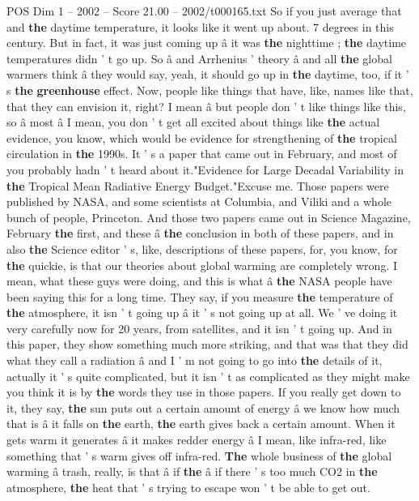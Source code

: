 \begin{textsample}{POS Dim 1 – 2002 – Score 21.00 – 2002/t000165.txt}
So if you just average that and \textbf{the} daytime temperature, it looks like it went up about. 7 degrees in this century.
But in fact, it was just coming up â it was \textbf{the} nighttime ; \textbf{the} daytime temperatures didn ' t go up.
So â and Arrhenius ' theory â and all \textbf{the} global warmers think â they would say, yeah, it should go up in \textbf{the} daytime, too, if it ' s \textbf{the} \textbf{greenhouse} effect.
Now, people like things that have, like, names like that, that they can envision it, right?
I mean â but people don ' t like things like this, so â most â I mean, you don ' t get all excited about things like \textbf{the} actual evidence, you know, which would be evidence for strengthening of \textbf{the} tropical circulation in \textbf{the} 1990s.
It ' s a paper that came out in February, and most of you probably hadn ' t heard about it."Evidence for Large Decadal Variability in \textbf{the} Tropical Mean Radiative Energy Budget."Excuse me.
Those papers were published by NASA, and some scientists at Columbia, and Viliki and a whole bunch of people, Princeton.
And those two papers came out in Science Magazine, February \textbf{the} first, and these â \textbf{the} conclusion in both of these papers, and in also \textbf{the} Science editor ' s, like, descriptions of these papers, for, you know, for \textbf{the} quickie, is that our theories about global warming are completely wrong.
I mean, what these guys were doing, and this is what â \textbf{the} NASA people have been saying this for a long time.
They say, if you measure \textbf{the} temperature of \textbf{the} atmosphere, it isn ' t going up â it ' s not going up at all.
We ' ve doing it very carefully now for 20 years, from satellites, and it isn ' t going up.
And in this paper, they show something much more striking, and that was that they did what they call a radiation â and I ' m not going to go into \textbf{the} details of it, actually it ' s quite complicated, but it isn ' t as complicated as they might make you think it is by \textbf{the} words they use in those papers.
If you really get down to it, they say, \textbf{the} sun puts out a certain amount of energy â we know how much that is â it falls on \textbf{the} earth, \textbf{the} earth gives back a certain amount.
When it gets warm it generates â it makes redder energy â I mean, like infra-red, like something that ' s warm gives off infra-red. \textbf{The} whole business of \textbf{the} global warming â trash, really, is that â if \textbf{the} â if there ' s too much CO2 in \textbf{the} atmosphere, \textbf{the} heat that ' s trying to escape won ' t be able to get out.

\end{textsample}
